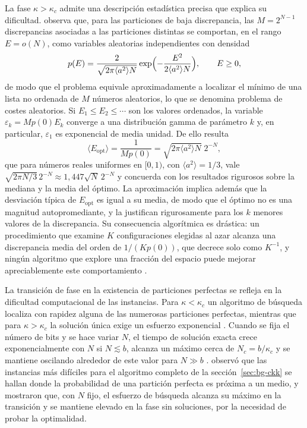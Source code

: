 La fase $\kappa > \kappa_c$ admite una descripción estadística precisa que explica su dificultad. \textcite{mertens2001} observa que, para las particiones de baja discrepancia, las $M = 2^{N-1}$ discrepancias asociadas a las particiones distintas se comportan, en el rango $E = o(N)$, como variables aleatorias independientes con densidad
\begin{equation}
    p(E) = \frac{2}{\sqrt{2\pi \langle a^2 \rangle N}} \exp\Bigl(-\frac{E^2}{2\langle a^2 \rangle N}\Bigr), \qquad E \geq 0,
    \label{eq:bg-cost-density}
\end{equation}
de modo que el problema equivale aproximadamente a localizar el mínimo de una lista no ordenada de $M$ números aleatorios, lo que se denomina problema de costes aleatorios. Si $E_1 \leq E_2 \leq \cdots$ son los valores ordenados, la variable $\varepsilon_k = M p(0) E_k$ converge a una distribución gamma de parámetro $k$ y, en particular, $\varepsilon_1$ es exponencial de media unidad. De ello resulta
\begin{equation}
    \langle E_{\mathrm{opt}} \rangle = \frac{1}{M p(0)} = \sqrt{2\pi \langle a^2 \rangle N}\; 2^{-N},
    \label{eq:bg-optimum}
\end{equation}
que para números reales uniformes en $[0,1)$, con $\langle a^2 \rangle = 1/3$, vale $\sqrt{2\pi N/3}\,2^{-N} \approx 1{,}447\sqrt{N}\,2^{-N}$ y concuerda con los resultados rigurosos sobre la mediana \parencite{karmarkar1986} y la media \parencite{lueker1998} del óptimo. La aproximación implica además que la desviación típica de $E_{\mathrm{opt}}$ es igual a su media, de modo que el óptimo no es una magnitud autopromediante, y \textcite{borgs2001} la justifican rigurosamente para los $k$ menores valores de la discrepancia. Su consecuencia algorítmica es drástica: un procedimiento que examine $K$ configuraciones elegidas al azar alcanza una discrepancia media del orden de $1/(K p(0))$, que decrece solo como $K^{-1}$, y ningún algoritmo que explore una fracción del espacio puede mejorar apreciablemente este comportamiento \parencite{mertens2001}.

La transición de fase en la existencia de particiones perfectas se refleja en la dificultad computacional de las instancias. Para $\kappa < \kappa_c$ un algoritmo de búsqueda localiza con rapidez alguna de las numerosas particiones perfectas, mientras que para $\kappa > \kappa_c$ la solución única exige un esfuerzo exponencial \parencite{mertens1998}. Cuando se fija el número de bits y se hace variar $N$, el tiempo de solución exacta crece exponencialmente con $N$ si $N \lesssim b$, alcanza un máximo cerca de $N_c = b/\kappa_c$ y se mantiene oscilando alrededor de este valor para $N \gg b$ \parencite{mertens2001,mertens2006}. \textcite{korf1998} observó que las instancias más difíciles para el algoritmo completo de la sección~\ref{sec:bg-ckk} se hallan donde la probabilidad de una partición perfecta es próxima a un medio, y \textcite{gent1996,gent1998} mostraron que, con $N$ fijo, el esfuerzo de búsqueda alcanza su máximo en la transición y se mantiene elevado en la fase sin soluciones, por la necesidad de probar la optimalidad.

